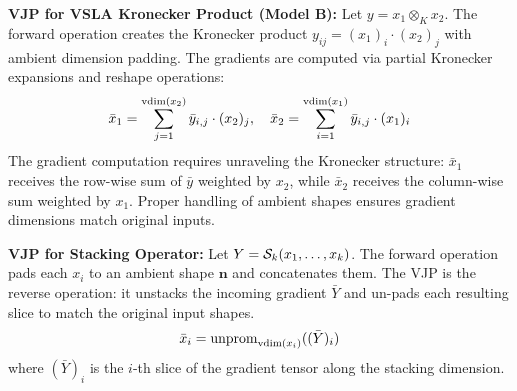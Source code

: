 \textbf{VJP for VSLA Kronecker Product (Model B):} Let \(y = x_1 \otimes_K x_2\). The forward operation creates the Kronecker product \(y_{ij} = (x_1)_i \cdot (x_2)_j\) with ambient dimension padding. The gradients are computed via partial Kronecker expansions and reshape operations:
\[
\bar{x}_1 = \sum_{j=1}^{\operatorname{vdim}(x_2)} \bar{y}_{i,j} \cdot (x_2)_j, \quad \bar{x}_2 = \sum_{i=1}^{\operatorname{vdim}(x_1)} \bar{y}_{i,j} \cdot (x_1)_i
\]
The gradient computation requires unraveling the Kronecker structure: \(\bar{x}_1\) receives the row-wise sum of \(\bar{y}\) weighted by \(x_2\), while \(\bar{x}_2\) receives the column-wise sum weighted by \(x_1\). Proper handling of ambient shapes ensures gradient dimensions match original inputs.

\textbf{VJP for Stacking Operator:} Let \(Y = \mathcal{S}_k(x_1, \dots, x_k)\). The forward operation pads each \(x_i\) to an ambient shape \(\mathbf{n}\) and concatenates them. The VJP is the reverse operation: it unstacks the incoming gradient \(\bar{Y}\) and un-pads each resulting slice to match the original input shapes.
\[
\bar{x}_i = \operatorname{unprom}_{\operatorname{vdim}(x_i)}( (\bar{Y})_i )
\]
where \((\bar{Y})_i\) is the $i$-th slice of the gradient tensor along the stacking dimension.

